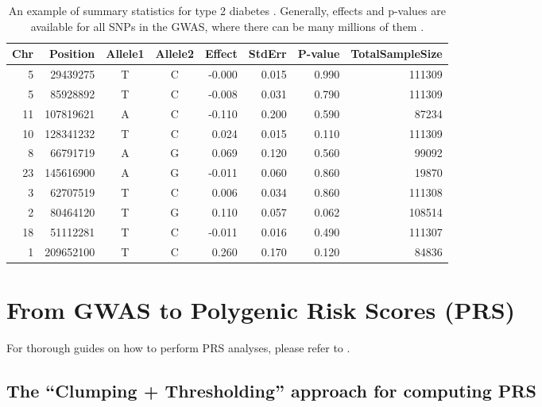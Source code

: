 \begin{table}[ht]
\caption{An example of summary statistics for type 2 diabetes \cite[]{scott2017expanded}. Generally, effects and p-values are available for all SNPs in the GWAS, where there can be many millions of them \cite[]{asking4more}.}\label{tab:sumstats}
\vspace{0.5em}
\centering
\begin{tabular}{rrccrrrr}
  \hline
Chr & Position & Allele1 & Allele2 & Effect & StdErr & P-value & TotalSampleSize \\ 
  \hline
   5 & 29439275 & T & C & -0.000 & 0.015 & 0.990 & 111309 \\ 
     5 & 85928892 & T & C & -0.008 & 0.031 & 0.790 & 111309 \\ 
    11 & 107819621 & A & C & -0.110 & 0.200 & 0.590 & 87234 \\ 
    10 & 128341232 & T & C & 0.024 & 0.015 & 0.110 & 111309 \\ 
     8 & 66791719 & A & G & 0.069 & 0.120 & 0.560 & 99092 \\ 
    23 & 145616900 & A & G & -0.011 & 0.060 & 0.860 & 19870 \\ 
     3 & 62707519 & T & C & 0.006 & 0.034 & 0.860 & 111308 \\ 
     2 & 80464120 & T & G & 0.110 & 0.057 & 0.062 & 108514 \\ 
    18 & 51112281 & T & C & -0.011 & 0.016 & 0.490 & 111307 \\ 
     1 & 209652100 & T & C & 0.260 & 0.170 & 0.120 & 84836 \\ 
   \hline
\end{tabular}
\end{table}




\section{From GWAS to Polygenic Risk Scores (PRS)}

For thorough guides on how to perform PRS analyses, please refer to \cite{wray2014research,chasioti2019progress,choi2018guide}.

\subsection{The ``Clumping + Thresholding'' approach for computing PRS}\label{sec:C+T}


